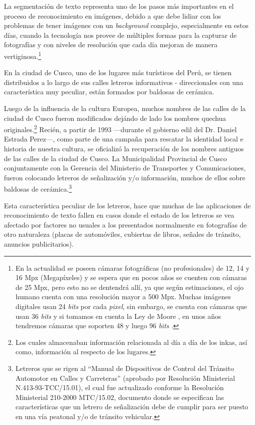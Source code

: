 La segmentación de texto representa uno de los pasos más importantes en el
proceso de reconocimiento en imágenes, debido a que debe lidiar con los
problemas de tener imágenes con un \textit{background} complejo, especialmente
en estos días, cuando la tecnología nos provee de múltiples formas para la
capturar de fotografías y con niveles de resolución que cada día mejoran de
manera vertiginosa.\footnote{En la actualidad se poseen cámaras fotográficas (no
profesionales) de 12, 14 y 16 Mpx (Megapíxeles) y se espera que en pocos años se
cuenten con cámaras de 25 Mpx, pero esto no se dentendrá allí, ya que según
estimaciones, el ojo humano cuenta con una resolución mayor a 500 Mpx. Muchas
imágenes digitales usan 24 \textit{bits} por cada \textit{pixel}, sin embargo,
se cuenta con cámaras que usan 36 \textit{bits} y si tomamos en cuenta la Ley de
Moore \citep{Moore:1965:CCIC}, en unos años tendremos cámaras que soporten 48 y
luego 96 \textit{bits} \citep{Myhrvold:2006:MLCPP}.}

En la ciudad de Cusco, uno de los lugares más turísticos del Perú, se tienen
distribuidos a lo largo de sus calles letreros informativos - direccionales con
una característica muy peculiar, están formados por baldosas de cerámica.

Luego de la influencia de la cultura Europea, muchos nombres de las calles de la
ciudad de Cusco fueron modificados dejándo de lado los nombres quechua
originales.\footnote{Los cuales almacenaban información relacionada al día a día
de los inkas, así como, información al respecto de los lugares.} Recién, a
partir de 1993 ---durante el gobierno edil del Dr. Daniel Estrada Perez---, como
parte de una campaña para rescatar la identidad local e historia de nuestra
cultura,  se oficializó la recuperación de los nombres antiguos de las calles de
la ciudad de Cusco. La Municipalidad Provincial de Cusco conjuntamente con la
Gerencia del Ministerio de Transportes y Comunicaciones, fueron colocando
letreros de señalización y/o información, muchos de ellos sobre baldosas de
cerámica.\footnote{Letreros que se rigen al ``Manual de Dispositivos de Control
del Tránsito Automotor en Calles y Carreteras'' (aprobado por Resolución
Ministerial N.413-93-TCC/15.01), el cual fue actualizado conforme la Resolución
Ministerial 210-2000 MTC/15.02, documento \citep{MTC:MDCTACC} donde se
especifican las características que un letrero de señalización debe de cumplir
para ser puesto en una vía peatonal y/o de tránsito vehicular.}

Esta característica peculiar de los letreros, hace que muchas de las
aplicaciones de reconocimiento de texto fallen en casos donde el estado de los
letreros se vea afectado por factores no usuales a los presentados normalmente
en fotografías de otro naturaleza (placas de automóviles, cubiertas de libros,
señales de tránsito, anuncios publicitarios).

